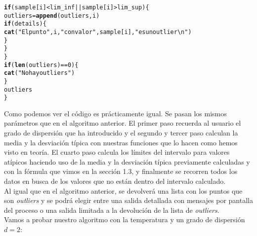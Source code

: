 \documentclass[12pt]{report}\usepackage[]{graphicx}\usepackage[dvipsnames]{xcolor}
\makeatletter
\newcommand{\hlnum}[1]{\textcolor[rgb]{0.686,0.059,0.569}{#1}}%
\newcommand{\hlstr}[1]{\textcolor[rgb]{0.192,0.494,0.8}{#1}}%
\newcommand{\hlopt}[1]{\textcolor[rgb]{0,0,0}{#1}}%
\newcommand{\hlstd}[1]{\textcolor[rgb]{0.345,0.345,0.345}{#1}}%
\newcommand{\hlkwa}[1]{\textcolor[rgb]{0.161,0.373,0.58}{\textbf{#1}}}%
\newcommand{\hlkwb}[1]{\textcolor[rgb]{0.69,0.353,0.396}{#1}}%
\newcommand{\hlkwd}[1]{\textcolor[rgb]{0.737,0.353,0.396}{\textbf{#1}}}%
\newenvironment{kframe}{%
 \def\at@end@of@kframe{}%
 \ifinner\ifhmode%
  \def\at@end@of@kframe{\end{minipage}}%
  \begin{minipage}{\columnwidth}%
 \fi\fi%
 \def\FrameCommand##1{\hskip\@totalleftmargin \hskip-\fboxsep
 \colorbox{shadecolor}{##1}\hskip-\fboxsep
     \hskip-\linewidth \hskip-\@totalleftmargin \hskip\columnwidth}%
 \MakeFramed {\advance\hsize-\width
   \@totalleftmargin\z@ \linewidth\hsize
   \@setminipage}}%
 {\par\unskip\endMakeFramed%
 \at@end@of@kframe}
\newenvironment{knitrout}{}{} %
\makeatother
\begin{document}
\begin{knitrout}
\begin{kframe}
\begin{alltt}
                \hlkwa{if}\hlstd{(sample[i]} \hlopt{<} \hlstd{lim_inf} \hlopt{||} \hlstd{sample[i]} \hlopt{>} \hlstd{lim_sup)\{}
                        \hlstd{outliers} \hlkwb{=} \hlkwd{append}\hlstd{(outliers, i)}
                        \hlkwa{if}\hlstd{(details)\{}
                                \hlkwd{cat}\hlstd{(}\hlstr{"El punto "}\hlstd{,i,}\hlstr{" con valor "}\hlstd{,sample[i],}\hlstr{" es un outlier\textbackslash{}n"}\hlstd{)}
                        \hlstd{\}}
                \hlstd{\}}
        \hlstd{\}}
        \hlkwa{if}\hlstd{(}\hlkwd{len}\hlstd{(outliers)} \hlopt{==} \hlnum{0}\hlstd{)\{}
                \hlkwd{cat}\hlstd{(}\hlstr{"No hay outliers"}\hlstd{)}
        \hlstd{\}}
        \hlstd{outliers}
\hlstd{\}}
\end{alltt}
\end{kframe}
\end{knitrout}
					
					Como podemos ver el código es prácticamente igual. Se pasan los mismos parámetros que en el algoritmo anterior. El primer paso recuerda al usuario el grado de dispersión que ha introducido y el segundo  y tercer paso calculan la media y la desviación típica con nuestras funciones que lo hacen como hemos visto en teoría. El cuarto paso calcula los límites del intervalo para valores atípicos haciendo uso de la media y la desviación típica previamente calculadas y con la fórmula que vimos en la sección 1.3, y finalmente se recorren todos los datos en busca de los valores que no están dentro del intervalo calculado.\\
					
					Al igual que en el algoritmo anterior, se devolverá una lista con los puntos que son \textit{outliers} y se podrá elegir entre una salida detallada con mensajes por pantalla del proceso o una salida limitada a la devolución de la lista de \textit{outliers}.\\
					
					Vamos a probar nuestro algoritmo con la temperatura y un grado de dispersión $d=2$:
					
\end{document}
